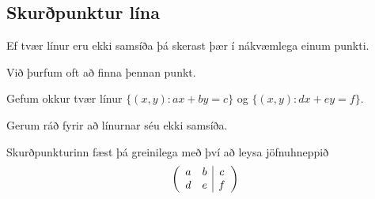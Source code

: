 \iffalse

\subsection{Skurðpunktur lína}
{
    {
        \item<1-> Ef tvær línur eru ekki samsíða þá skerast þær í nákvæmlega einum punkti.
        \item<2-> Við þurfum oft að finna þennan punkt.
        \item<3-> Gefum okkur tvær línur $\{(x, y) : ax + by=c\}$ og $\{(x, y) : dx + ey=f\}$.
        \item<4-> Gerum ráð fyrir að línurnar séu ekki samsíða.
        \item<5-> Skurðpunkturinn fæst þá greinilega með því að leysa jöfnuhneppið
        \[
            \left (
            \begin{array}{c c | c}
                a & b & c\\
                d & e & f
            \end{array}
            \right )
        \]
    }
}

